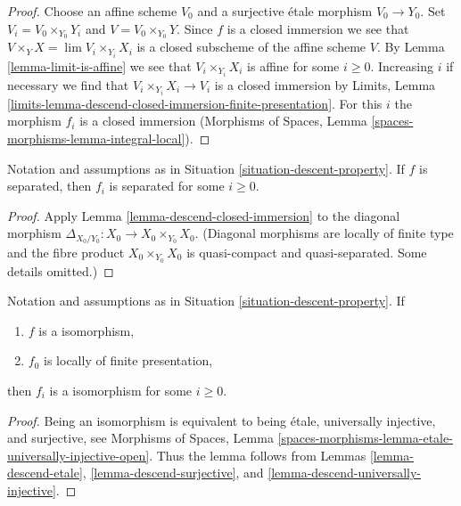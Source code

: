 \begin{proof}
Choose an affine scheme $V_0$ and a surjective \'etale morphism $V_0 \to Y_0$.
Set $V_i = V_0 \times_{Y_0} Y_i$ and $V = V_0 \times_{Y_0} Y$.
Since $f$ is a closed immersion we see that
$V \times_Y X = \lim V_i \times_{Y_i} X_i$
is a closed subscheme of the affine scheme $V$. By
Lemma \ref{lemma-limit-is-affine} we see that
$V_i \times_{Y_i} X_i$ is affine for some $i \geq 0$. Increasing $i$ if
necessary we find that $V_i \times_{Y_i} X_i \to V_i$ is a closed immersion by
Limits, Lemma \ref{limits-lemma-descend-closed-immersion-finite-presentation}.
For this $i$ the morphism $f_i$ is a closed immersion
(Morphisms of Spaces, Lemma \ref{spaces-morphisms-lemma-integral-local}).
\end{proof}

\begin{lemma}
\label{lemma-descend-separated-morphism}
Notation and assumptions as in Situation \ref{situation-descent-property}.
If $f$ is separated, then $f_i$ is separated for some $i \geq 0$.
\end{lemma}

\begin{proof}
Apply Lemma \ref{lemma-descend-closed-immersion}
to the diagonal morphism $\Delta_{X_0/Y_0} : X_0 \to X_0 \times_{Y_0} X_0$.
(Diagonal morphisms are locally of finite type
and the fibre product $X_0 \times_{Y_0} X_0$ is quasi-compact and
quasi-separated. Some details omitted.)
\end{proof}

\begin{lemma}
\label{lemma-descend-isomorphism}
Notation and assumptions as in Situation \ref{situation-descent-property}. If
\begin{enumerate}
\item $f$ is a isomorphism,
\item $f_0$ is locally of finite presentation,
\end{enumerate}
then $f_i$ is a isomorphism for some $i \geq 0$.
\end{lemma}

\begin{proof}
Being an isomorphism is equivalent to being \'etale, universally injective,
and surjective, see
Morphisms of Spaces, Lemma
\ref{spaces-morphisms-lemma-etale-universally-injective-open}.
Thus the lemma follows from
Lemmas \ref{lemma-descend-etale},
\ref{lemma-descend-surjective}, and
\ref{lemma-descend-universally-injective}.
\end{proof}

